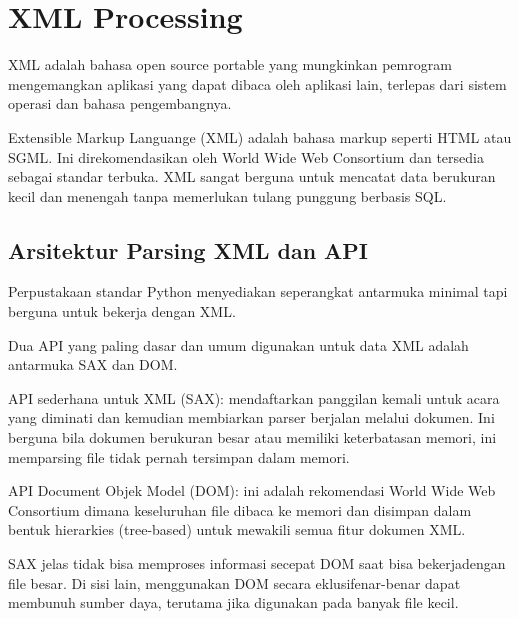 \section{XML Processing} 
\hspace*{0.5in} XML adalah bahasa open source portable yang mungkinkan pemrogram mengemangkan aplikasi yang dapat dibaca oleh aplikasi lain, terlepas dari sistem operasi dan bahasa pengembangnya. 
\vspace{12pt}
 
\hspace*{0.5in} Extensible Markup Languange (XML) adalah bahasa markup seperti HTML atau SGML. Ini direkomendasikan oleh World Wide Web Consortium dan tersedia sebagai standar terbuka. XML sangat berguna untuk mencatat data berukuran kecil dan menengah tanpa memerlukan tulang punggung berbasis SQL. 

\vspace{12pt}
\subsection{Arsitektur Parsing XML dan API} 
 
\hspace*{0.5in} Perpustakaan standar Python menyediakan seperangkat antarmuka minimal tapi berguna untuk bekerja dengan XML.  
 
\hspace*{0.5in} Dua API yang paling dasar dan umum digunakan untuk data XML adalah antarmuka SAX dan DOM. 
 
\hspace*{0.5in} API sederhana untuk XML (SAX): mendaftarkan panggilan kemali untuk acara yang diminati dan kemudian membiarkan parser berjalan melalui dokumen. Ini berguna bila dokumen berukuran besar atau memiliki keterbatasan memori, ini memparsing file tidak pernah tersimpan dalam memori. 
 
\hspace*{0.5in} API Document Objek Model (DOM): ini adalah rekomendasi World Wide Web Consortium dimana keseluruhan file dibaca ke memori dan disimpan dalam bentuk hierarkies (tree-based) untuk mewakili semua fitur dokumen XML.  
 
\hspace*{0.5in} SAX jelas tidak bisa memproses informasi secepat DOM saat bisa bekerjadengan file besar. Di sisi lain, menggunakan DOM secara eklusifenar-benar dapat membunuh sumber daya, terutama jika digunakan pada banyak file kecil. 
 
